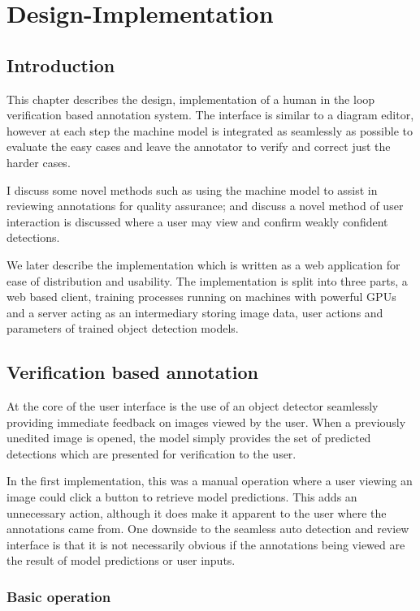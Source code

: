 \chapter{Design-Implementation}
\label{chap:design} 

\section{Introduction}

This chapter describes the design, implementation of a human in the loop verification based annotation system. The interface is similar to a diagram editor, however at each step the machine model is integrated as seamlessly as possible to evaluate the easy cases and leave the annotator to verify and correct just the harder cases. 

I discuss some novel methods such as using the machine model to assist in reviewing annotations for quality assurance; and discuss a novel method of user interaction is discussed where a user may view and confirm weakly confident detections. 

We later describe the implementation which is written as a web application for ease of distribution and usability. The implementation is split into three parts, a web based client, training processes running on machines with powerful \gls{GPU}s and a server acting as an intermediary storing image data, user actions and parameters of trained object detection models.


\section {Verification based annotation}

At the core of the user interface is the use of an object detector seamlessly providing immediate feedback on images viewed by the user. When a previously unedited image is opened, the model simply provides the set of predicted detections which are presented for verification to the user. 

In the first implementation, this was a manual operation where a user viewing an image could click a button to retrieve model predictions. This adds an unnecessary action, although it does make it apparent to the user where the annotations came from. One downside to the seamless auto detection and review interface is that it is not necessarily obvious if the annotations being viewed are the result of model predictions or user inputs.

\subsection{Basic operation}


